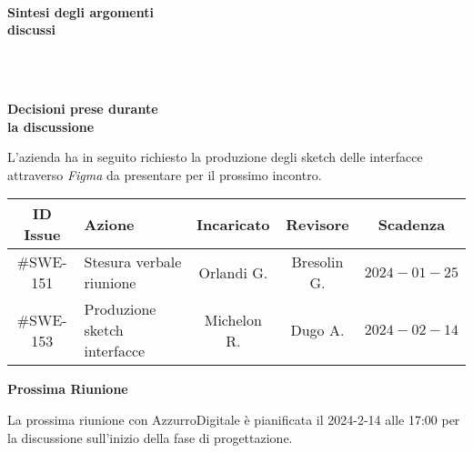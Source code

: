 \documentclass[10pt, a4paper]{article}
\title{\data}
\author{SWEetCode}
\begin{document}


\setlength{\columnsep}{2.2em}
\setlength{\columnseprule}{4pt}
\begin{paracol}{2}


\intestazione
\vspace{5.0em}

\partecipanti

\newpage

\switchcolumn
\revisioneAzioni
\vspace{23.5em}

\ordineGiorno

\newpage


\switchcolumn

\\
\textbf{Sintesi degli argomenti\\discussi}

~\newpage


\\
\textbf{Decisioni prese durante\\la discussione}

\switchcolumn

\discussione
L'azienda ha in seguito richiesto la produzione degli sketch delle interfacce attraverso \textit{Figma} da presentare per il prossimo incontro.

\newpage

\decisioni

\end{paracol}

\newpage


{\renewcommand{\arraystretch}{1.5}
\begin{tabularx}{\textwidth}{c|X|c|c|c}
\textbf{ID Issue} & \textbf{Azione} & \textbf{Incaricato} & \textbf{Revisore} & \textbf{Scadenza} \\
\hline
\#SWE-151 &
Stesura verbale riunione &
Orlandi G. &
Bresolin G. &
$2024-01-25$ \\
\hline
\#SWE-153 &
Produzione sketch interfacce &
Michelon R. &
Dugo A. &
$2024-02-14$ \\

\end{tabularx}}

\vspace{3em}


\textbf{Prossima Riunione}

La prossima riunione con AzzurroDigitale è pianificata il 2024-2-14 alle 17:00 per la discussione sull'inizio della fase di progettazione.
\end{document}
